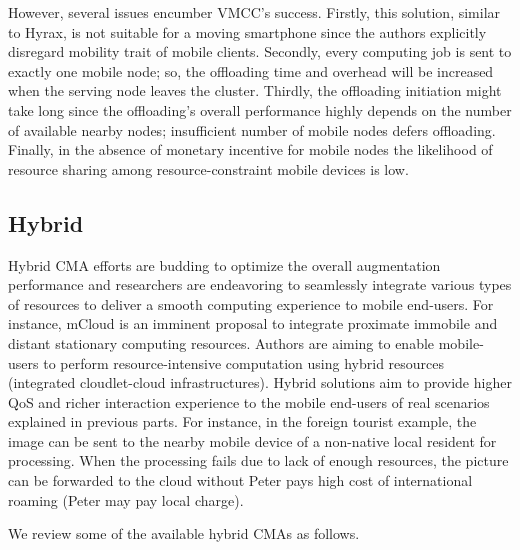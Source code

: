 \documentclass[publish]{IEEEtran}
\begin{document}
\begin{itemize}
However, several issues encumber VMCC's success. Firstly, this solution, similar to Hyrax, is not suitable for a moving smartphone since the authors explicitly disregard mobility trait of mobile clients. Secondly, every computing job is sent to exactly one mobile node; so, the offloading time and overhead will be increased when the serving node leaves the cluster. Thirdly, the offloading initiation might take long since the offloading's overall performance highly depends on the number of available nearby nodes; insufficient number of mobile nodes defers offloading. Finally, in the absence of monetary incentive for mobile nodes the likelihood of resource sharing among resource-constraint mobile devices is low. 
\end{itemize}

\subsection{Hybrid}
Hybrid CMA efforts are budding \cite{SAMI,Soyata2012,Rahimi2012} to optimize the overall augmentation performance and researchers are endeavoring to seamlessly integrate various types of resources to deliver a smooth computing experience to mobile end-users. For instance, mCloud \cite{Bahl2012} is an imminent proposal to integrate proximate immobile and distant stationary computing resources. Authors are aiming to enable mobile-users to perform resource-intensive computation using hybrid resources (integrated cloudlet-cloud infrastructures). Hybrid solutions aim to provide higher QoS and richer interaction experience to the mobile end-users of real scenarios explained in previous parts. For instance, in the foreign tourist example, the image can be sent to the nearby mobile device of a non-native local resident for processing. When the processing fails due to lack of enough resources, the picture can be forwarded to the cloud without Peter pays high cost of international roaming (Peter may pay local charge). 

We review some of the available hybrid CMAs as follows. 
\end{document}
